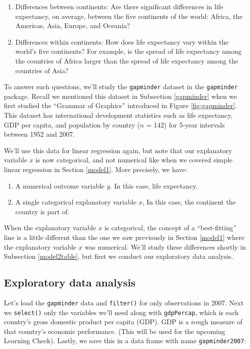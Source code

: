 \documentclass[12pt,]{krantz}
\providecommand{\tightlist}{%
  \setlength{\itemsep}{0pt}\setlength{\parskip}{0pt}}
\begin{document}
\begin{enumerate}
\def\labelenumi{\arabic{enumi}.}
\tightlist
\item
  Differences between continents: Are there significant differences in
  life expectancy, on average, between the five continents of the world:
  Africa, the Americas, Asia, Europe, and Oceania?
\item
  Differences within continents: How does life expectancy vary within
  the world's five continents? For example, is the spread of life
  expectancy among the countries of Africa larger than the spread of
  life expectancy among the countries of Asia?
\end{enumerate}

To answer such questions, we'll study the \texttt{gapminder} dataset in
the \texttt{gapminder} package. Recall we mentioned this dataset in
Subsection \ref{gapminder} when we first studied the ``Grammar of
Graphics'' introduced in Figure \ref{fig:gapminder}. This dataset has
international development statistics such as life expectancy, GDP per
capita, and population by country (\(n\) = 142) for 5-year intervals
between 1952 and 2007.

We'll use this data for linear regression again, but note that our
explanatory variable \(x\) is now categorical, and not numerical like
when we covered simple linear regression in Section \ref{model1}. More
precisely, we have:

\begin{enumerate}
\def\labelenumi{\arabic{enumi}.}
\tightlist
\item
  A numerical outcome variable \(y\). In this case, life expectancy.
\item
  A single categorical explanatory variable \(x\), In this case, the
  continent the country is part of.
\end{enumerate}

When the explanatory variable \(x\) is categorical, the concept of a
``best-fitting'' line is a little different than the one we saw
previously in Section \ref{model1} where the explanatory variable \(x\)
was numerical. We'll study these differences shortly in Subsection
\ref{model2table}, but first we conduct our exploratory data analysis.

\subsection{Exploratory data analysis}\label{model2EDA}

Let's load the \texttt{gapminder} data and \texttt{filter()} for only
observations in 2007. Next we \texttt{select()} only the variables we'll
need along with \texttt{gdpPercap}, which is each country's gross
domestic product per capita (GDP). GDP is a rough measure of that
country's economic performance. (This will be used for the upcoming
Learning Check). Lastly, we save this in a data frame with name
\texttt{gapminder2007}:
\end{document}
